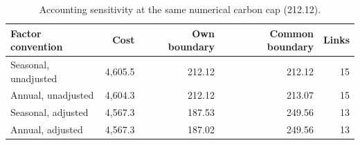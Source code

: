 \begin{table}[H]
\centering\small
\caption{Accounting sensitivity at the same numerical carbon cap (212.12).}\label{tab:accounting}
\begin{tabular}{@{}lrrrr@{}}
\toprule
Factor convention & Cost & Own boundary & Common boundary & Links \\
\midrule
Seasonal, unadjusted & 4,605.5 & 212.12 & 212.12 & 15 \\
Annual, unadjusted & 4,604.3 & 212.12 & 213.07 & 15 \\
Seasonal, adjusted & 4,567.3 & 187.53 & 249.56 & 13 \\
Annual, adjusted & 4,567.3 & 187.02 & 249.56 & 13 \\
\bottomrule
\end{tabular}
\end{table}
